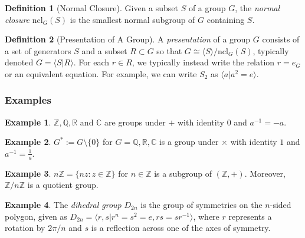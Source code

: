 \documentclass{article}
\theoremstyle{definition}
\newtheorem{definition}{Definition}[subsection]
\newtheorem{example}{Example}[subsection]
\begin{document}
\begin{definition}[Normal Closure]
    Given a subset $S$ of a group $G$, the \textit{normal closure} $\text{ncl}_G(S)$ is the smallest normal subgroup of $G$ containing $S$.
\end{definition}
\begin{definition}[Presentation of A Group]
    A \textit{presentation} of a group $G$ consists of a set of generators $S$ and a subset $R\subset G$ so that $G\cong \langle S \rangle/{\text{ncl}_G(S)}$, typically denoted $G=\langle S | R\rangle$. For each $r\in R$, we typically instead write the relation $r=e_G$ or an equivalent equation. For example, we can write $S_2$ as $\langle a | a^2=e\rangle$.
\end{definition}
\subsubsection{Examples}
\begin{example}
    $\mathbb{Z,Q,R}$ and $\mathbb{C}$ are groups under $+$ with identity $0$ and $a^{-1}=-a$.
\end{example}
\begin{example}
    $G^*:=G\setminus \{0\}$ for $G=\mathbb{Q,R,C}$ is a group under $\times$ with identity $1$ and $a^{-1}=\frac{1}{a}$.
\end{example}
\begin{example}
    $n\mathbb{Z}=\{nz:z\in\mathbb{Z}\}$ for $n\in\mathbb{Z}$ is a subgroup of $(\mathbb{Z},+)$. Moreover, $\mathbb{Z}/n\mathbb{Z}$ is a quotient group.
\end{example}
\begin{example}
    The \textit{dihedral group} $D_{2n}$ is the group of symmetries on the $n$-sided polygon, given as $D_{2n}=\langle r,s | r^n=s^2=e, rs=sr^{-1}\rangle$, where $r$ represents a rotation by $2\pi/n$ and $s$ is a reflection across one of the axes of symmetry.
\end{example}
\end{document}
